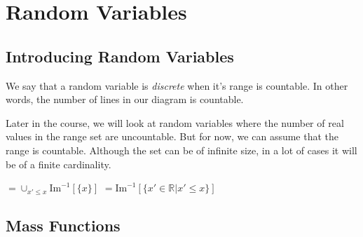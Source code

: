 
\chapter{Random Variables}


\section{Introducing Random Variables}





We say that a random variable is \textit{discrete} when it's range is countable. 
In other words, the number of lines in our diagram is countable. 


Later in the course, we will look at random variables where the number 
of real values in the range set are uncountable. 
But for now, we can assume that the range is countable.
Although the set can be of infinite size, in a lot of 
cases it will be of a finite cardinality. 



\frmrule 




$= \cup_{x' \leqslant x} \text{Im}^{-1} [\{x\}] $
$= \text{Im}^{-1} [\{x' \in \mathbb{R} | x' \leqslant x\}] $


\section{Mass Functions}











